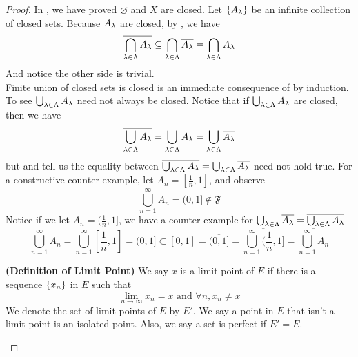 \documentclass{report}
\begin{document}
\begin{proof}
In , we have proved $\varnothing$ and $X$ are closed. Let $\{ A_\lambda \}$ be an infinite collection of closed sets. Because $A_\lambda $ are closed, by , we have
\begin{equation}
\overline{\bigcap_{\lambda  \in \Lambda }A_\lambda }\subseteq \bigcap _{\lambda \in\Lambda }\overline{A_\lambda }=\bigcap _{\lambda \in\Lambda }A_\lambda 
\end{equation}
And notice the other side is trivial.\\

Finite union of closed sets is closed is an immediate consequence of  by induction. To see $\bigcup_{\lambda \in \Lambda }A_\lambda $ need not always be closed. Notice that if $\bigcup _{\lambda \in\Lambda }A_\lambda$ are closed, then we have
 \begin{equation}
   \overline{\bigcup_{\lambda \in \Lambda }A_\lambda}=\bigcup_{\lambda \in\Lambda }A_\lambda=\bigcup_{\lambda \in\Lambda }\overline{A_\lambda }
\end{equation}
but  and  tell us the equality between $\overline{\bigcup_{\lambda \in\Lambda }A_\lambda }=\bigcup_{\lambda \in \Lambda }\overline{A_\lambda }$ need not hold true. For a constructive counter-example, let $A_n=[\frac{1}{n},1]$, and observe
\begin{equation}
  \bigcup_{n=1}^\infty A_n=(0,1]\not\in \mathfrak{F}
\end{equation}
Notice if we let $A_n=(\frac{1}{n},1]$, we have a counter-example for $\bigcup_{\lambda \in \Lambda }\overline{A_\lambda }=\overline{\bigcup _{\lambda \in\Lambda }A_\lambda }$
\begin{equation}
  \bigcup_{n=1}^\infty A_n=\bigcup_{n=1}^\infty [\frac{1}{n},1]=(0,1]\subset [0,1]=\overline{(0,1]}=\overline{\bigcup_{n=1}^\infty(\frac{1}{n},1]}=\overline{\bigcup _{n=1}^\infty A_n}
\end{equation}
\begin{definition}
\label{1.2.6}
\textbf{(Definition of Limit Point)} We say $x$ is a limit point of  $E$ if there is a sequence $\{ x_n \}$ in $E$ such that
\begin{equation}
\lim_{n\to\infty} x_n=x\text{ and }\forall n, x_n\neq x
\end{equation}
We denote the set of limit points of $E$ by  $E'$. We say a point in $E$ that isn't a limit point is an isolated point. Also, we say a set is perfect if $E'=E$. 

\end{definition}
\end{proof}
\end{document}
